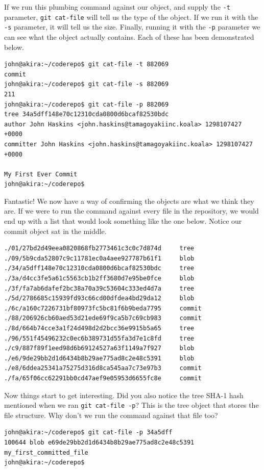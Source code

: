 If we run this plumbing command against our object, and supply the \texttt{-t} parameter, \texttt{git cat-file} will tell us the type of the object.  If we run it with the \texttt{-s} parameter, it will tell us the size.  Finally, running it with the \texttt{-p} parameter we can see what the object actually contains.  Each of these has been demonstrated below.

\begin{Verbatim}[frame=leftline,framerule=1mm,fontsize=\relsize{-3}]
john@akira:~/coderepo$ git cat-file -t 882069
commit
john@akira:~/coderepo$ git cat-file -s 882069
211
john@akira:~/coderepo$ git cat-file -p 882069
tree 34a5dff148e70c12310cda0800d6bcaf82530bdc
author John Haskins <john.haskins@tamagoyakiinc.koala> 1298107427 +0000
committer John Haskins <john.haskins@tamagoyakiinc.koala> 1298107427 +0000

My First Ever Commit
john@akira:~/coderepo$ 
\end{Verbatim}

Fantastic!  We now have a way of confirming the objects are what we think they are.  If we were to run the command against every file in the repository, we would end up with a list that would look something like the one below.  Notice our commit object sat in the middle.

\begin{Verbatim}[frame=leftline,framerule=1mm,fontsize=\relsize{-3}]
./01/27bd2d49eea0820868fb2773461c3c0c7d874d		tree
./09/5b9cda52807c9c11781ec0a4aee927787b61f1		blob
./34/a5dff148e70c12310cda0800d6bcaf82530bdc		tree
./3a/d4cc3fe5a61c5563cb1b2ff3680d7e95be0fce		blob
./3f/fa7ab6dafef2bc38a70a39c53604c333ed4d7a		tree
./5d/2786685c15939fd93c66cd00dfdea4bd29da12		blob
./6c/a160c7226731bf80973fc5bc81f6b9beda7795		commit
./88/206926cb60aed53d21ede69f9ca5b7c69cb983		commit
./8d/664b74cce3a1f24d498d2d2bcc36e9915b5a65		tree
./96/551f45496232c0ec6b389731d55fa3d7e1c8fd		tree
./c9/887f89f1eed98d6b69124527a63f1149a7f927		blob
./e6/9de29bb2d1d6434b8b29ae775ad8c2e48c5391		blob
./e8/6ddea25341a75275d316d8ca545aa7c73e97b3		commit
./fa/65f06cc62291bb0cd47aef9e05953d6655fc8e		commit
\end{Verbatim}

Now things start to get interesting.  Did you also notice the tree SHA-1 hash mentioned when we ran \texttt{git cat-file -p}?  This is the tree object that stores the file structure.  Why don't we run the command against that file too?

\begin{Verbatim}[frame=leftline,framerule=1mm,fontsize=\relsize{-3}]
john@akira:~/coderepo$ git cat-file -p 34a5dff
100644 blob e69de29bb2d1d6434b8b29ae775ad8c2e48c5391	my_first_committed_file
john@akira:~/coderepo$ 
\end{Verbatim}

